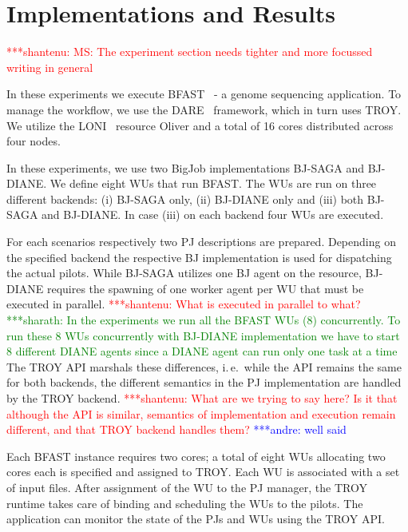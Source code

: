 \documentclass[conference,final]{IEEEtran}
\newcommand{\jhanote}[1]{ {\textcolor{red} { ***shantenu: #1 }}}
\newcommand{\alnote}[1]{ {\textcolor{blue} { ***andre: #1 }}}
\newcommand{\smnote}[1]{ {\textcolor{green} { ***sharath: #1 }}}
\newcommand{\alnote}[1]{}
\newcommand{\smnote}[1]{}
\newcommand{\jhanote}[1]{}
\newcommand{\upp}{\vspace*{-0.5em}}
\begin{document}
\section{Implementations and Results\upp\upp}


\jhanote{MS: The experiment section needs tighter and more focussed
  writing in general}

In these experiments we execute BFAST~\cite{bfast2009} - a genome
sequencing application. To manage the workflow, we use the
DARE~\cite{dare-tg11} framework, which in turn uses TROY.  We utilize
the LONI~\cite{loni}  resource Oliver and a total of 16 cores
distributed across four nodes.

In these experiments, we use two BigJob implementations BJ-SAGA and
BJ-DIANE. We define eight WUs that run BFAST. The WUs are run on three
different backends: (i) BJ-SAGA only, (ii) BJ-DIANE only and (iii)
both BJ-SAGA and BJ-DIANE. In case (iii) on each backend four WUs are
executed.

For each scenarios respectively two PJ descriptions are prepared. Depending on
the specified backend the respective BJ implementation is used for dispatching
the actual pilots. While BJ-SAGA utilizes one BJ agent on the resource, BJ-DIANE
requires the spawning of one worker agent per WU that must be executed in
parallel. \jhanote{What is executed in parallel to what?} \smnote{In the
experiments we run all the BFAST WUs (8) concurrently. To run these 8 WUs
concurrently with BJ-DIANE implementation we have to start 8 different DIANE
agents since a DIANE agent can run only one task at a time}The TROY API marshals
these differences, i.\,e.\ while the API remains the same for both backends,
the different semantics in the PJ implementation are handled by the TROY 
backend.
\jhanote{What are we trying to say here?  Is it that although the API
  is similar, semantics of implementation and execution remain
  different, and that TROY backend handles them?}\alnote{well said}

Each BFAST instance requires two cores; a total of eight WUs
allocating two cores each is specified and assigned to TROY. Each WU
is associated with a set of input files. After assignment of the WU to
the PJ manager, the TROY runtime takes care of binding and scheduling
the WUs to the pilots. The application can monitor the state of the
PJs and WUs using the TROY API.
\end{document}
